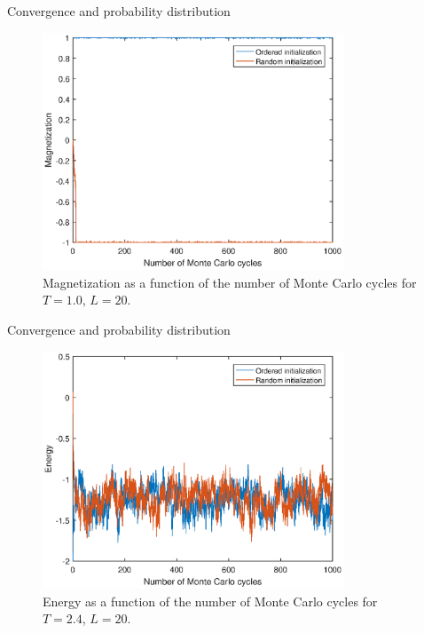 \documentclass{beamer}
\begin{document}
\begin{frame}{Convergence and probability distribution}
\begin{figure}
	\includegraphics[width=0.8\textwidth]{Process_mag_lowT.eps}
	\caption{Magnetization as a function of the number of Monte Carlo cycles for $T=1.0$, $L=20$. }
\end{figure}
\end{frame}

\begin{frame}{Convergence and probability distribution}
\begin{figure}
	\includegraphics[width=0.8\textwidth]{Process_ene_highT.eps}
	\caption{Energy as a function of the number of Monte Carlo cycles for $T=2.4$, $L=20$. }
\end{figure}
\end{frame}
\end{document}
